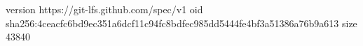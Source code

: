 version https://git-lfs.github.com/spec/v1
oid sha256:4ceacfc6bd9ec351a6dcf11c94fc8bdfec985dd5444fe4bf3a51386a76b9a613
size 43840
